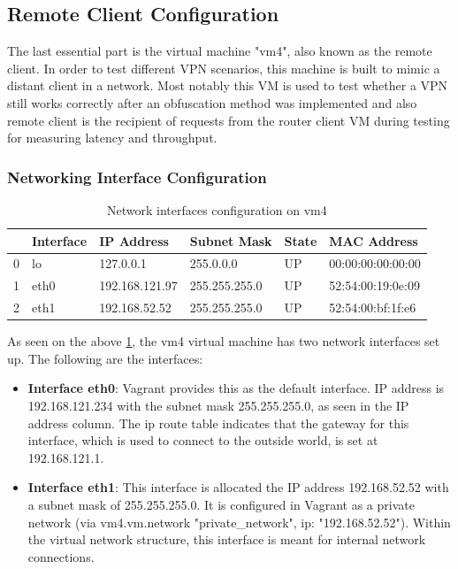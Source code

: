 \documentclass[12pt, fleqn, a4paper]{article}
\begin{document}
\subsection{Remote Client Configuration}
The last essential part is the virtual machine "vm4", also known as the remote client. In order to test different VPN scenarios, this machine is built to mimic a distant client in a network. Most notably this VM is used to test whether a VPN still works correctly after an obfuscation method was implemented and also remote client is the recipient of requests from the router client VM during testing for measuring latency and throughput.
\subsubsection{Networking Interface Configuration}
\begin{table}[H]
	\caption{Network interfaces configuration on vm4}
	\centering
  \begin{tabular}{llllll}
\toprule
{} & Interface &      IP Address &    Subnet Mask & State &        MAC Address \\
\midrule
0 &        lo &       127.0.0.1 &      255.0.0.0 &    UP &  00:00:00:00:00:00 \\
1 &      eth0 &  192.168.121.97 &  255.255.255.0 &    UP &  52:54:00:19:0e:09 \\
2 &      eth1 &   192.168.52.52 &  255.255.255.0 &    UP &  52:54:00:bf:1f:e6 \\
\bottomrule
\end{tabular}
  \label{tab:vm4_1}
\end{table}
As seen on the above \cref{tab:vm4_1}, the vm4 virtual machine has two network interfaces set up. The following are the interfaces:
\begin{itemize}
\item \textbf{Interface eth0}: Vagrant provides this as the default interface. IP address is 192.168.121.234 with the subnet mask 255.255.255.0, as seen in the IP address column. The ip route table indicates that the gateway for this interface, which is used to connect to the outside world, is set at 192.168.121.1.
\item \textbf{Interface eth1}: This interface is allocated the IP address 192.168.52.52 with a subnet mask of 255.255.255.0. It is configured in Vagrant as a private network (via vm4.vm.network "private\_network", ip: "192.168.52.52"). Within the virtual network structure, this interface is meant for internal network connections.
\end{itemize}
\end{document}
